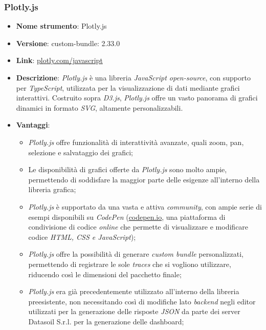 \subsubsection{Plotly.js}
\begin{itemize}
      \item \textbf{Nome strumento}: Plotly.js
      \item \textbf{Versione}: custom-bundle: 2.33.0
      \item \textbf{Link}: \href{https://plotly.com/javascript/}{plotly.com/javascript}
      \item \textbf{Descrizione}: \textit{Plotly.js} è una libreria \textit{JavaScript open-source}, con supporto per \textit{TypeScript}, utilizzata per la visualizzazione di dati mediante grafici interattivi.
            Costruito sopra \textit{D3.js}, \textit{Plotly.js} offre un vasto panorama di grafici dinamici in formato \textit{\gls{SVG}\glox}, altamente personalizzabili.
      \item \textbf{Vantaggi}:
            \begin{itemize}
                  \item \textit{Plotly.js} offre funzionalità di interattività avanzate, quali zoom, pan, selezione e salvataggio dei grafici;
                  \item Le disponibilità di grafici offerte da \textit{Plotly.js} sono molto ampie, permettendo di soddisfare la maggior parte delle esigenze
                        all'interno della libreria grafica;
                  \item \textit{Plotly.js} è supportato da una vasta e attiva \textit{community}, con ampie serie di esempi disponibili su \textit{CodePen} (\href{https://codepen.io/}{codepen.io}, una piattaforma di condivisione di codice
                        \textit{online} che permette di visualizzare e modificare codice \textit{HTML, CSS e JavaScript});
                  \item \textit{Plotly.js} offre la possibilità di generare \textit{custom \gls{bundle}\glox} personalizzati, permettendo di registrare le sole \textit{traces} che si vogliono utilizzare, riducendo
                        così le dimensioni del pacchetto finale;
                  \item \textit{Plotly.js} era già precedentemente utilizzato all'interno della libreria preesistente, non necessitando così di modifiche lato \textit{\gls{backend}\glox} negli editor
                        utilizzati per la generazione delle risposte \textit{JSON} da parte dei server Datasoil S.r.l. per la generazione delle dashboard;

\end{itemize}
\end{itemize}
